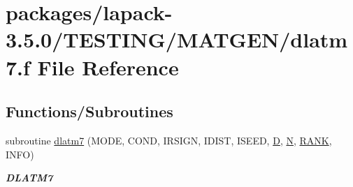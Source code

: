 \hypertarget{dlatm7_8f}{}\section{packages/lapack-\/3.5.0/\+T\+E\+S\+T\+I\+N\+G/\+M\+A\+T\+G\+E\+N/dlatm7.f File Reference}
\label{dlatm7_8f}
\subsection*{Functions/\+Subroutines}
\begin{DoxyCompactItemize}
\item 
subroutine \hyperlink{group__double__matgen_ga8aa127ed6d5f49ec4eafb49c111d9a7b}{dlatm7} (M\+O\+D\+E, C\+O\+N\+D, I\+R\+S\+I\+G\+N, I\+D\+I\+S\+T, I\+S\+E\+E\+D, \hyperlink{odrpack_8h_a7dae6ea403d00f3687f24a874e67d139}{D}, \hyperlink{polmisc_8c_a0240ac851181b84ac374872dc5434ee4}{N}, \hyperlink{splinemodule_8c_a3a88bcc63386de30443dacede2e01847}{R\+A\+N\+K}, I\+N\+F\+O)
\begin{DoxyCompactList}\small\item\em {\bfseries D\+L\+A\+T\+M7} \end{DoxyCompactList}\end{DoxyCompactItemize}
